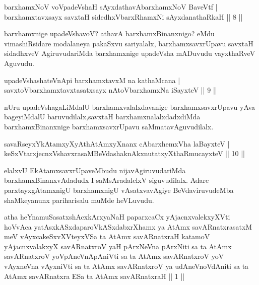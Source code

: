 \begin{shl}
barxhamxNoV voVpadeVshaH sAyxdathavA\s barxhamxNoV BaveVtf |\\
barxhamxtavxsayx savxtaH sidedhxVbarxRhamxNi sAyxdanathaRkaH \hfill || 8 ||
\end{shl}

\begin{artha}
barxhamxnige upadeVshavoV? athavA barxhamxBinanxnigo? eMdu vimashiRsidare modalaneya pakaSxvu sariyalalx, barxhamxsavxrUpavu savxtaH sidadhxveV AgiruvudariMda barxhamxnige upadeVsha mADuvudu vayxthaRveV Aguvudu.
\end{artha}


\begin{shl}
upadeVshashateVnApi barxhamxtavxM na kathaMcana |\\
savxtoV\s barxhamxtavxtasatxsayx nAtoV\s barxhamxNa iSayxteV \hfill || 9 ||
\end{shl}

\begin{artha}
nUru upadeVshagaLiMdalU barxhamxvalalxdavanige barxhamxsavxrUpavu yAva bageyiMdalU baruvudilalx,savxtaH barxhamxnalalxdadxdiMda barxhamxBinanxnige barxhamxsavxrUpavu saMmatavAguvudilalx.
\end{artha}

\begin{shl}
savaRseyxYkAtamxyXyAthAtAmxyXnanx cAbarxhemxVha laBayxteV |\\
keSxVtarxjecnxVshavxrasaMBeVdashaknAkxnutatxyXthaRmucayxteV \hfill || 10 ||
\end{shl}

\begin{artha}
elalxvU EkAtamxsavxrUpaveMbudu nijavAgiruvudariMda barxhamxBinanxvAdadudx I saMsAradalelxV siguvudilalx. Adare parxtayxgAtamxnigU barxhamxnigU vAsatxvavAgiye BeVdaviruvudeMba shaMkeyanunx pariharisalu muMde heVLuvudu.
\end{artha}


\begin{kandikeshl}
atha heYnamuSasatxshAcxkArxyaNaH paparxcaCx yAjacnxvalekxyXVti hoVvAca yatAsxkASxdaparoVkASxdabxrXhamx ya AtAmx savARnatxrasatxM meV vAyxcakeSxvXVteyxVSa ta AtAmx savARnatxraH katamoV yAjacnxvalakxyX savARnatxroV yaH pArxNeVna pArxNiti sa ta AtAmx savARnatxroV yoV\s pAneVnApAniVti sa ta AtAmx savARnatxroV yoV vAyxneVna vAyxniVti sa ta AtAmx savARnatxroV ya udAneVnoVdAniti sa ta AtAmx savARnatxra ESa ta AtAmx savARnatxraH || 1 ||
\end{kandikeshl}

